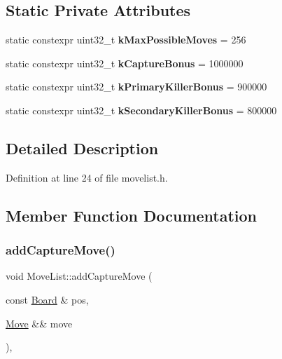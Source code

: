 \subsection*{Static Private Attributes}
\begin{DoxyCompactItemize}
\item 
\mbox{\label{classMoveList_a532b7bebe93bf5c880f4052f00e7e94d}} 
static constexpr uint32\+\_\+t {\bfseries k\+Max\+Possible\+Moves} = 256
\item 
\mbox{\label{classMoveList_a8e4934092e8a2758dab3e29c0ee3b279}} 
static constexpr uint32\+\_\+t {\bfseries k\+Capture\+Bonus} = 1000000
\item 
\mbox{\label{classMoveList_a943cdb5871724b348df4cf6a1633857f}} 
static constexpr uint32\+\_\+t {\bfseries k\+Primary\+Killer\+Bonus} = 900000
\item 
\mbox{\label{classMoveList_a859b219cee0c5eb99ba68ff98e25560d}} 
static constexpr uint32\+\_\+t {\bfseries k\+Secondary\+Killer\+Bonus} = 800000
\end{DoxyCompactItemize}


\subsection{Detailed Description}


Definition at line 24 of file movelist.\+h.



\subsection{Member Function Documentation}
\mbox{\label{classMoveList_a9ee3ce73b272288e63c3d7a0bd255bd0}} 
\subsubsection{\texorpdfstring{add\+Capture\+Move()}{addCaptureMove()}}
{\footnotesize\ttfamily void Move\+List\+::add\+Capture\+Move (\begin{DoxyParamCaption}\item[{const \mbox{\hyperlink{classBoard}{Board}} \&}]{pos,  }\item[{\mbox{\hyperlink{classMove}{Move}} \&\&}]{move }\end{DoxyParamCaption})\hspace{0.3cm}{\ttfamily [private]}, {\ttfamily [noexcept]}}



